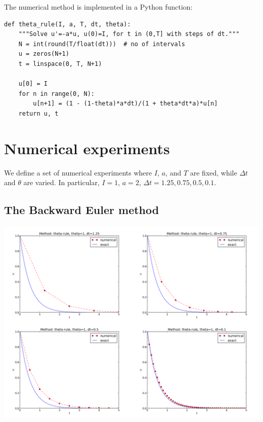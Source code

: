 \documentclass[twoside]{article}
\begin{document}
The numerical method is implemented in a Python function:

\begin{verbatim}
def theta_rule(I, a, T, dt, theta):
    """Solve u'=-a*u, u(0)=I, for t in (0,T] with steps of dt."""
    N = int(round(T/float(dt)))  # no of intervals
    u = zeros(N+1)
    t = linspace(0, T, N+1)

    u[0] = I
    for n in range(0, N):
        u[n+1] = (1 - (1-theta)*a*dt)/(1 + theta*dt*a)*u[n]
    return u, t
\end{verbatim}



\section{Numerical experiments}


We define a set of numerical experiments where $I$, $a$, and $T$ are
fixed, while $\Delta t$ and $\theta$ are varied.
In particular, $I=1$, $a=2$, $\Delta t = 1.25, 0.75, 0.5, 0.1$.




\subsection{The Backward Euler method}



\begin{center}  %
  \centerline{\includegraphics[width=0.9\linewidth]{BE.png}}
\end{center}
\end{document}

